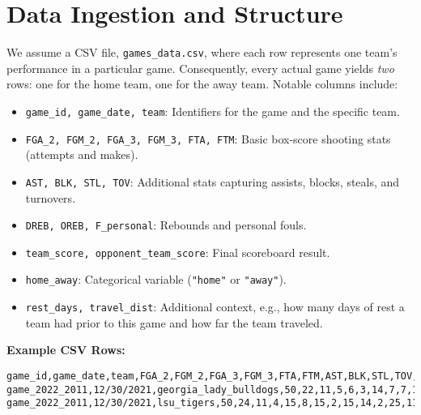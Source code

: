 \documentclass[12pt]{article}
\begin{document}
\section{Data Ingestion and Structure}
We assume a CSV file, \texttt{games\_data.csv}, where each row represents one team's performance in a particular game. Consequently, every actual game yields \emph{two} rows: one for the home team, one for the away team. Notable columns include:

\begin{itemize}[noitemsep]
    \item \texttt{game\_id, game\_date, team}: Identifiers for the game and the specific team.
    \item \texttt{FGA\_2, FGM\_2, FGA\_3, FGM\_3, FTA, FTM}: Basic box-score shooting stats (attempts and makes).
    \item \texttt{AST, BLK, STL, TOV}: Additional stats capturing assists, blocks, steals, and turnovers.
    \item \texttt{DREB, OREB, F\_personal}: Rebounds and personal fouls.
    \item \texttt{team\_score, opponent\_team\_score}: Final scoreboard result.
    \item \texttt{home\_away}: Categorical variable (\texttt{"home"} or \texttt{"away"}).
    \item \texttt{rest\_days, travel\_dist}: Additional context, e.g., how many days of rest a team had prior to this game and how far the team traveled.
\end{itemize}

\noindent
\textbf{Example CSV Rows:}
\begin{verbatim}
game_id,game_date,team,FGA_2,FGM_2,FGA_3,FGM_3,FTA,FTM,AST,BLK,STL,TOV,TOV_team,DREB,OREB,F_tech,F_personal,team_score,opponent_team_score,largest_lead,notD1_incomplete,OT_length_min_tot,rest_days,attendance,tz_dif_H_E,prev_game_dist,home_away,home_away_NS,travel_dist
game_2022_2011,12/30/2021,georgia_lady_bulldogs,50,22,11,5,6,3,14,7,7,18,0,25,11,0,18,62,68,1.0,False,,9.0,3241.0,0.0,0.0,home,1,0.0
game_2022_2011,12/30/2021,lsu_tigers,50,24,11,4,15,8,15,2,15,14,2,25,11,0,7,68,62,14.0,False,,3.0,3241.0,0.0,824.0,away,-1,824.0
\end{verbatim}
\end{document}
